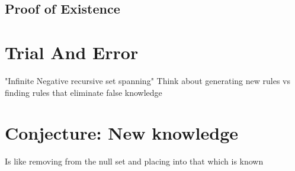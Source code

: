 \documentclass[11pt]{article}
\begin{document}
\subsection{Proof of Existence}





\section{Trial And Error}
"Infinite Negative recursive set spanning"
Think about generating new rules vs finding rules that eliminate false knowledge







\section{Conjecture: New knowledge}
Is like removing from the null set and placing into that which is known
\end{document}
